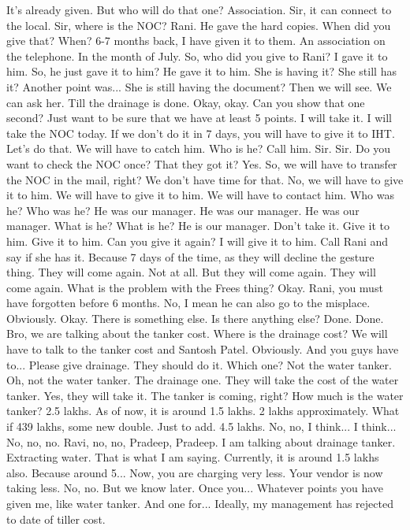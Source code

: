 It's already given.
But who will do that one?
Association.
Sir, it can connect to the local.
Sir, where is the NOC?
Rani.
He gave the hard copies.
When did you give that?
When?
6-7 months back, I have given it to them.
An association on the telephone.
In the month of July.
So, who did you give to Rani?
I gave it to him.
So, he just gave it to him?
He gave it to him.
She is having it?
She still has it?
Another point was...
She is still having the document?
Then we will see.
We can ask her.
Till the drainage is done.
Okay, okay.
Can you show that one second?
Just want to be sure that we have at least 5 points.
I will take it.
I will take the NOC today.
If we don't do it in 7 days, you will have to give it to IHT.
Let's do that.
We will have to catch him.
Who is he?
Call him.
Sir.
Sir.
Do you want to check the NOC once?
That they got it?
Yes.
So, we will have to transfer the NOC in the mail, right?
We don't have time for that.
No, we will have to give it to him.
We will have to give it to him.
We will have to contact him.
Who was he?
Who was he?
He was our manager.
He was our manager.
He was our manager.
What is he?
What is he?
He is our manager.
Don't take it.
Give it to him.
Give it to him.
Can you give it again?
I will give it to him.
Call Rani and say if she has it.
Because 7 days of the time, as they will decline the gesture thing.
They will come again.
Not at all.
But they will come again.
They will come again.
What is the problem with the Frees thing?
Okay.
Rani, you must have forgotten before 6 months.
No, I mean he can also go to the misplace.
Obviously.
Okay.
There is something else.
Is there anything else?
Done.
Done.
Bro, we are talking about the tanker cost.
Where is the drainage cost?
We will have to talk to the tanker cost and Santosh Patel.
Obviously.
And you guys have to...
Please give drainage.
They should do it.
Which one?
Not the water tanker.
Oh, not the water tanker.
The drainage one.
They will take the cost of the water tanker.
Yes, they will take it.
The tanker is coming, right?
How much is the water tanker?
2.5 lakhs.
As of now, it is around 1.5 lakhs.
2 lakhs approximately.
What if 439 lakhs, some new double.
Just to add.
4.5 lakhs.
No, no, I think...
I think...
No, no, no.
Ravi, no, no, Pradeep, Pradeep.
I am talking about drainage tanker.
Extracting water.
That is what I am saying.
Currently, it is around 1.5 lakhs also.
Because around 5...
Now, you are charging very less.
Your vendor is now taking less.
No, no.
But we know later.
Once you...
Whatever points you have given me, like water tanker.
And one for...
Ideally, my management has rejected to date of tiller cost.
